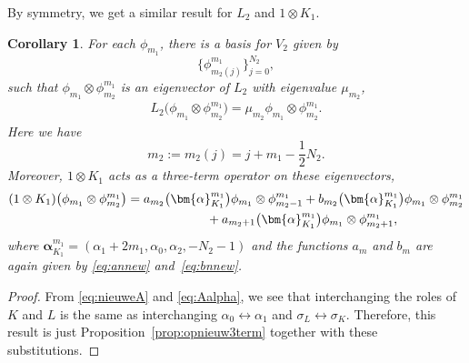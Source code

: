 \documentclass[pdftex]{sigma}
\numberwithin{equation}{section}
\newtheorem{Corollary}[Theorem]{Corollary}
\newcommand{\half}{\frac{1}{2}}
\begin{document}
By symmetry, we get a similar result for $L_2$ and $1\otimes K_1$.
\begin{Corollary}\label{cor:3termomgedraaid}
	For each $\phi_{m_1}$, there is a basis for $V_2$ given by
	\[
	\big\{\phi_{m_2(j)}^{m_1}\big\}_{j=0}^{N_2},
	\]
	such that $\phi_{m_1}\otimes\phi_{m_2}^{m_1}$ is an eigenvector of $L_2$ with eigenvalue $\mu_{m_2}$,
	\begin{gather*}
		L_2\big(\phi_{m_1}\otimes\phi_{m_2}^{m_1}\big) = \mu_{m_2}\phi_{m_1}\otimes\phi_{m_2}^{m_1}.
	\end{gather*}
	Here we have
	\[
	m_2:=m_2(j)=j+m_1-\half N_2.
	\]
	Moreover, $1\otimes K_1$ acts as a three-term operator on these eigenvectors,
	\begin{gather*}
(1\otimes K_1)\big(\phi_{m_1}\otimes\phi_{m_2}^{m_1}\big)= a_{m_2}\big(\bm{\alpha}_{K_1}^{m_1}\big) \phi_{m_1}\otimes\phi_{m_2-1}^{m_1} + b_{m_2}\big(\bm{\alpha}_{K_1}^{m_1}\big) \phi_{m_1}\otimes\phi_{m_2}^{m_1} \\
\hphantom{(1\otimes K_1)\big(\phi_{m_1}\otimes\phi_{m_2}^{m_1}\big)=}{}
+ a_{m_2+1}\big(\bm{\alpha}_{K_1}^{m_1}\big)\phi_{m_1}\otimes\phi_{m_2+1}^{m_1} ,
	\end{gather*}
	where $\bm{\alpha}_{K_1}^{m_1}=(\alpha_1+2m_1,\alpha_0,\alpha_2,-N_2-1)$ and the functions $a_{m}$ and $b_{m}$ are again given by \eqref{eq:annew} and~\eqref{eq:bnnew}.
\end{Corollary}
\begin{proof}
From \eqref{eq:nieuweA} and \eqref{eq:Aalpha}, we see that interchanging the roles of $K$ and $L$ is the same as interchanging $\alpha_0\leftrightarrow \alpha_1$ and $\sigma_L\leftrightarrow \sigma_K$. Therefore, this result is just Proposition~\ref{prop:opnieuw3term} together with these substitutions.
\end{proof}
\end{document}
